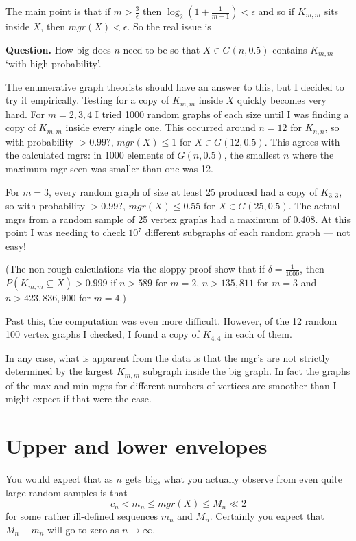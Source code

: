 \documentclass[12pt]{article}
\begin{document}
The main point is that if $m > \frac{3}{\epsilon}$ then $\log_2(1+\frac{1}{m-1}) < \epsilon$ and so if $K_{m,m}$ sits inside $X$, then $mgr(X) < \epsilon$. So the real issue is

\medskip\noindent
\textbf{Question.} How big does $n$ need to be so that $X \in G(n,0.5)$ contains $K_{m,m}$ `with high probability'.

\medskip

The enumerative graph theorists should have an answer to this, but I decided to try it empirically. Testing for a copy of $K_{m,m}$ inside $X$ quickly becomes very hard. For $m = 2,3,4$ I tried 1000 random graphs of each size until I was finding a copy of $K_{m,m}$ inside every single one. This occurred around $n=12$ for $K_{n,n}$, so with probability $> 0.99?$, $mgr(X) \le 1$ for $X \in G(12,0.5)$. This agrees with the calculated mgrs: in 1000 elements of $G(n,0.5)$, the smallest $n$ where the maximum mgr seen was smaller than one was 12.

For $m=3$, every random graph of size at least 25 produced had a copy of $K_{3,3}$, so with probability $> 0.99?$, $mgr(X) \le 0.55$ for $X \in G(25,0.5)$. The actual mgrs from a random sample of 25 vertex graphs had a maximum of 0.408. At this point I was needing to check $10^7$ different subgraphs of each random graph --- not easy!

(The non-rough calculations via the sloppy proof show that if $\delta = \frac{1}{1000}$, then $P(K_{m,m} \subseteq X) > 0.999$ if $n > 589$ for $m=2$, $n >135,811$ for $m = 3$ and $n > 423,836,900$ for $m = 4$.)

Past this, the computation was even more difficult. However, of the 12 random 100 vertex graphs I checked, I found a copy of $K_{4,4}$ in each of them.

In any case, what is apparent from the data is that the mgr's are not strictly determined by the largest $K_{m,m}$ subgraph inside the big graph. In fact the graphs of the max and min mgrs for different numbers of vertices are smoother than I might expect if that were the case.

\bigskip
\section*{Upper and lower envelopes}

You would expect that as $n$ gets big, what you actually observe from even quite large random samples is that
  \[ c_n < m_n \le mgr(X) \le M_n \ll 2 \]
for some rather ill-defined sequences $m_n$ and $M_n$. Certainly you expect that $M_n - m_n$ will go to zero as $n \to \infty$.
\end{document}
